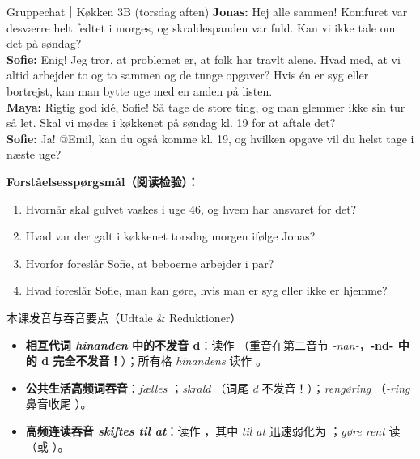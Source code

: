 \vspace{0.35em}
\begin{emailbox}{Gruppechat｜Køkken 3B (torsdag aften)}
\textbf{Jonas:} Hej alle sammen! Komfuret var desværre helt fedtet i morges, og skraldespanden var fuld. Kan vi ikke tale om det på søndag?\\
\textbf{Sofie:} Enig! Jeg tror, at problemet er, at folk har travlt alene. Hvad med, at vi altid arbejder to og to sammen og  de tunge opgaver? Hvis én er syg eller bortrejst, kan man bytte uge med en anden på listen.\\
\textbf{Maya:} Rigtig god idé, Sofie! Så  tage de store ting, og man glemmer ikke sin tur så let. Skal vi mødes i køkkenet på søndag kl. 19 for at aftale det?\\
\textbf{Sofie:} Ja! @Emil, kan du også komme kl. 19, og hvilken opgave vil du helst tage i næste uge?
\end{emailbox}

\textbf{Forståelsesspørgsmål（阅读检验）：}
\begin{enumerate}
  \item Hvornår skal gulvet vaskes i uge 46, og hvem har ansvaret for det?\\[2pt]\underline{\hspace{11.5cm}}
  \item Hvad var der galt i køkkenet torsdag morgen ifølge Jonas?\\[2pt]\underline{\hspace{11.5cm}}
  \item Hvorfor foreslår Sofie, at beboerne arbejder i par?\\[2pt]\underline{\hspace{11.5cm}}
  \item Hvad foreslår Sofie, man kan gøre, hvis man er syg eller ikke er hjemme?\\[2pt]\underline{\hspace{11.5cm}}
\end{enumerate}

\begin{tipbox}{本课发音与吞音要点（Udtale \& Reduktioner）}
\begin{itemize}
  \item \textbf{相互代词 \textit{hinanden} 中的不发音 d}：读作 （重音在第二音节 \textit{-nan-}，\textbf{-nd- 中的 d 完全不发音！}）；所有格 \textit{hinandens} 读作 。
  \item \textbf{公共生活高频词吞音}：\textit{fælles} ；\textit{skrald} （词尾 \textit{d} 不发音！）；\textit{rengøring} （\textit{-ring} 鼻音收尾 ）。
  \item \textbf{高频连读吞音 \textit{skiftes til at}}：读作 ，其中 \textit{til at} 迅速弱化为 ；\textit{gøre rent} 读 （或 ）。
\end{itemize}
\end{tipbox}

